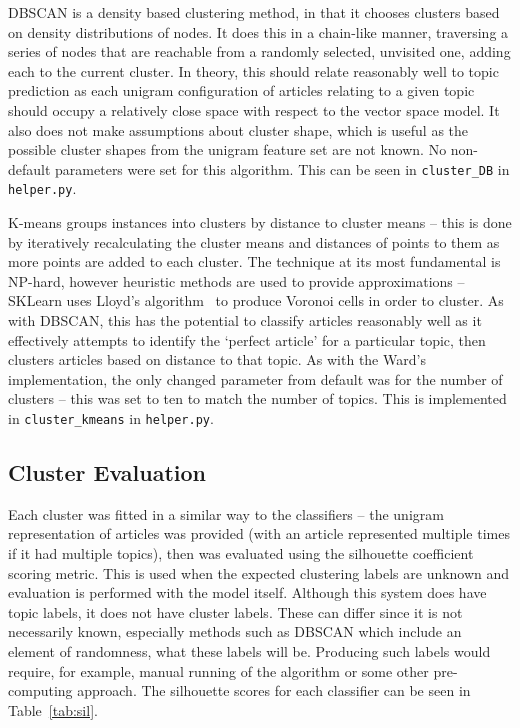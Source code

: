 \documentclass[11pt]{article}
\begin{document}
DBSCAN is a density based clustering method, in that it chooses clusters based on density distributions of nodes. It does this in a chain-like manner, traversing a series of nodes that are reachable from a randomly selected, unvisited one, adding each to the current cluster. In theory, this should relate reasonably well to topic prediction as each unigram configuration of articles relating to a given topic should occupy a relatively close space with respect to the vector space model. It also does not make assumptions about cluster shape, which is useful as the possible cluster shapes from the unigram feature set are not known. No non-default parameters were set for this algorithm. This can be seen in \texttt{cluster\_DB} in \texttt{helper.py}.

K-means groups instances into clusters by distance to cluster means – this is done by iteratively recalculating the cluster means and distances of points to them as more points are added to each cluster. The technique at its most fundamental is NP-hard, however heuristic methods are used to provide approximations – SKLearn uses Lloyd's algorithm~\cite{lloyds} to produce Voronoi cells in order to cluster. As with DBSCAN, this has the potential to classify articles reasonably well as it effectively attempts to identify the `perfect article' for a particular topic, then clusters articles based on distance to that topic. As with the Ward’s implementation, the only changed parameter from default was for the number of clusters – this was set to ten to match the number of topics. This is implemented in \texttt{cluster\_kmeans} in \texttt{helper.py}.

\subsection{Cluster Evaluation}
Each cluster was fitted in a similar way to the classifiers – the unigram representation of articles was provided (with an article represented multiple times if it had multiple topics), then was evaluated using the silhouette coefficient scoring metric. This is used when the expected clustering labels are unknown and evaluation is performed with the model itself. Although this system does have topic labels, it does not have cluster labels. These can differ since it is not necessarily known, especially methods such as DBSCAN which include an element of randomness, what these labels will be. Producing such labels would require, for example, manual running of the algorithm or some other pre-computing approach. The silhouette scores for each classifier can be seen in Table~\ref{tab:sil}.
\end{document}
